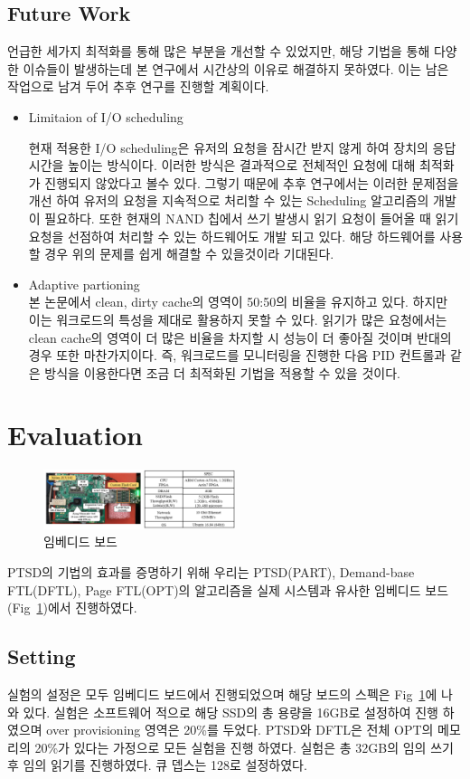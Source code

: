 \documentclass[conference]{IEEEtran}
\begin{document}
\subsection{Future Work}
언급한 세가지 최적화를 통해 많은 부분을 개선할 수 있었지만, 해당 기법을 통해 다양한 이슈들이 발생하는데 본 연구에서 시간상의 이유로 해결하지 못하였다. 이는 남은 작업으로 남겨 두어 추후 연구를 진행할 계획이다. 
\begin{itemize}
	\item{Limitaion of I/O scheduling}\par
	현재 적용한 I/O scheduling은 유저의 요청을 잠시간 받지 않게 하여 장치의 응답시간을 높이는 방식이다. 이러한 방식은 결과적으로 전체적인 요청에 대해 최적화가 진행되지 않았다고 볼수 있다. 그렇기 때문에 추후 연구에서는 이러한 문제점을 개선 하여 유저의 요청을 지속적으로 처리할 수 있는 Scheduling 알고리즘의 개발이 필요하다. 또한 현재의 NAND 칩에서 쓰기 발생시 읽기 요청이 들어올 때 읽기 요청을 선점하여 처리할 수 있는 하드웨어도 개발 되고 있다. 해당 하드웨어를 사용할 경우 위의 문제를 쉽게 해결할 수 있을것이라 기대된다.
	\item{Adaptive partioning}\\
	본 논문에서 clean, dirty cache의 영역이 50:50의 비율을 유지하고 있다. 하지만 이는 워크로드의 특성을 제대로 활용하지 못할 수 있다. 읽기가 많은 요청에서는 clean cache의 영역이 더 많은 비율을 차지할 시 성능이 더 좋아질 것이며 반대의 경우 또한 마찬가지이다. 즉, 워크로드를 모니터링을 진행한 다음 PID 컨트롤과 같은 방식을 이용한다면 조금 더 최적화된 기법을 적용할 수 있을 것이다.
\end{itemize}
\section{Evaluation}
\begin{figure}[h]
	\centering
	\includegraphics[width=0.5\textwidth]{image/EVAL/zync.png}
	\caption{임베디드 보드}
	\label{fig:zync}
\end{figure}
PTSD의 기법의 효과를 증명하기 위해 우리는 PTSD(PART), Demand-base FTL(DFTL), Page FTL(OPT)의 알고리즘을 실제 시스템과 유사한 임베디드 보드(Fig~\ref{fig:zync})에서 진행하였다.
\subsection{Setting}
실험의 설정은 모두 임베디드 보드에서 진행되었으며 해당 보드의 스펙은 Fig~\ref{fig:zync}에 나와 있다. 실험은 소프트웨어 적으로 해당 SSD의 총 용량을 16GB로 설정하여 진행 하였으며 over provisioning 영역은 20\%를 두었다. PTSD와 DFTL은 전체 OPT의 메모리의 20\%가 있다는 가정으로 모든 실험을 진행 하였다. 실험은 총 32GB의 임의 쓰기후 임의 읽기를 진행하였다. 큐 뎁스는 128로 설정하였다.
\end{document}
